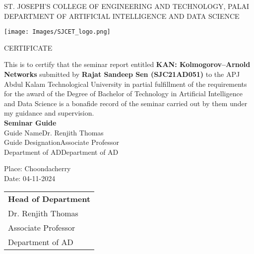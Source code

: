 \newpage
\thispagestyle{empty}
\begin{center}
\normalsize{ST. JOSEPH’S COLLEGE OF ENGINEERING AND TECHNOLOGY, PALAI}\\[0.5cm]
\normalsize
 { DEPARTMENT OF ARTIFICIAL INTELLIGENCE AND DATA SCIENCE}\\[1.0cm]%
   \begin{center}
   \texttt{[image: Images/SJCET\_logo.png]}
   \end{center}
{\large CERTIFICATE}\\[1.5cm]
\end{center}
\normalsize 
This is to certify that the seminar report entitled {\textbf{KAN: Kolmogorov–Arnold \\ Networks}} submitted by { \bf Rajat Sandeep Sen (SJC21AD051)} to the APJ Abdul Kalam Technological University in partial fulfillment of the requirements for the award of the Degree of Bachelor of Technology in Artificial Intelligence and Data Science is a bonafide record of the seminar carried out by them under my guidance and supervision.\vspace{1.3 cm}\\
{\bf Seminar Guide}\hspace{8.2 cm}{\bf Seminar Coordinator}\\
Guide Name\hspace{9.0 cm}Dr. Renjith Thomas\\
Guide Designation\hspace{7.85 cm}Associate Professor\hspace{2.6 cm}\\Department of AD\hspace{7.9 cm}Department of AD
\vspace{1.3 cm}\\
\begin{minipage}[t]{0.5\textwidth}
\begin{flushleft}
\setlength{\leftskip}{0pt} %
\vspace{0.2 cm}
Place: Choondacherry \\
Date: 04-11-2024
\end{flushleft}
\end{minipage}%
\begin{minipage}[t]{0.49\textwidth}
\begin{flushright}
\begin{tabular}{l}
\textbf{Head of Department} \\
Dr. Renjith Thomas \\
Associate Professor \\
Department of AD
\end{tabular}
\end{flushright}
\end{minipage}
                
